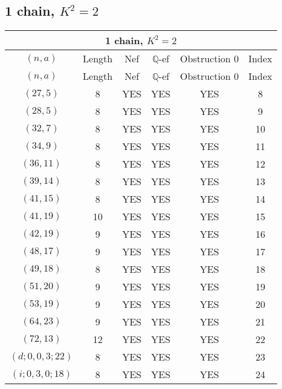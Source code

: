 \subsection{1 chain, $K^2 = 2$}
\begin{longtable}{|c|c|c|c|c|c|}
\hline
\multicolumn{6}{|c|}{1 chain, $K^2 = 2$}\\
\hline
$(n,a)$ & Length & Nef & $\mathbb Q$-ef & Obstruction 0 & Index\\
\hline
\endfirsthead

\hline
$(n,a)$ & Length & Nef & $\mathbb Q$-ef & Obstruction 0 & Index\\
\hline
\endhead
\hline
\endfoot

$(27, 5)$ & 8 & YES & YES & YES & 8\\
$(28, 5)$ & 8 & YES & YES & YES & 9\\
$(32, 7)$ & 8 & YES & YES & YES & 10\\
$(34, 9)$ & 8 & YES & YES & YES & 11\\
$(36, 11)$ & 8 & YES & YES & YES & 12\\
$(39, 14)$ & 8 & YES & YES & YES & 13\\
$(41, 15)$ & 8 & YES & YES & YES & 14\\
$(41, 19)$ & 10 & YES & YES & YES & 15\\
$(42, 19)$ & 9 & YES & YES & YES & 16\\
$(48, 17)$ & 9 & YES & YES & YES & 17\\
$(49, 18)$ & 8 & YES & YES & YES & 18\\
$(51, 20)$ & 9 & YES & YES & YES & 19\\
$(53, 19)$ & 9 & YES & YES & YES & 20\\
$(64, 23)$ & 9 & YES & YES & YES & 21\\
$(72, 13)$ & 12 & YES & YES & YES & 22\\
$(d; 0, 0, 3; 22)$ & 8 & YES & YES & YES & 23\\
$(i; 0, 3, 0; 18)$ & 8 & YES & YES & YES & 24
\end{longtable}
